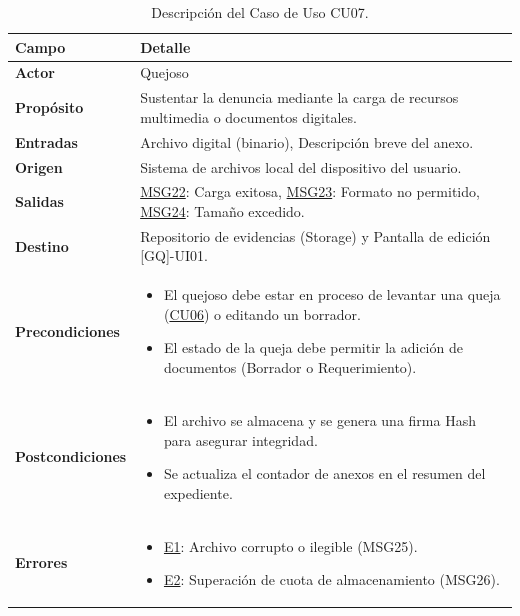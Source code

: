 \begin{appendices}
\begin{table}[htbp]
\centering
\small
\begin{tabular}{|p{3.5cm}|p{10.5cm}|}
\hline
\rowcolor[HTML]{EFEFEF} 
\textbf{Campo} & \textbf{Detalle} \\ \hline
\textbf{Actor} & Quejoso \\ \hline
\textbf{Propósito} & Sustentar la denuncia mediante la carga de recursos multimedia o documentos digitales. \\ \hline
\textbf{Entradas} & Archivo digital (binario), Descripción breve del anexo. \\ \hline
\textbf{Origen} & Sistema de archivos local del dispositivo del usuario. \\ \hline
\textbf{Salidas} & \hyperlink{msg:MSG22}{MSG22}: Carga exitosa, \hyperlink{msg:MSG23}{MSG23}: Formato no permitido, \hyperlink{msg:MSG24}{MSG24}: Tamaño excedido. \\ \hline
\textbf{Destino} & Repositorio de evidencias (Storage) y Pantalla de edición [GQ]-UI01. \\ \hline
\textbf{Precondiciones} & 
\begin{itemize}[nosep, leftmargin=*]
    \item El quejoso debe estar en proceso de levantar una queja (\hyperlink{anexo:casos_uso}{CU06}) o editando un borrador.
    \item El estado de la queja debe permitir la adición de documentos (Borrador o Requerimiento).
\end{itemize} \\ \hline
\textbf{Postcondiciones} & 
\begin{itemize}[nosep, leftmargin=*]
    \item El archivo se almacena y se genera una firma Hash para asegurar integridad.
    \item Se actualiza el contador de anexos en el resumen del expediente.
\end{itemize} \\ \hline
\textbf{Errores} & 
\begin{itemize}[nosep, leftmargin=*]
    \item \hyperlink{err:E12}{E1}: Archivo corrupto o ilegible (MSG25).
    \item \hyperlink{err:E13}{E2}: Superación de cuota de almacenamiento (MSG26).
\end{itemize} \\ \hline
\end{tabular}
\caption{Descripción del Caso de Uso CU07.}
\label{tab:cu07_especificacion}
\end{table}


\end{appendices}
